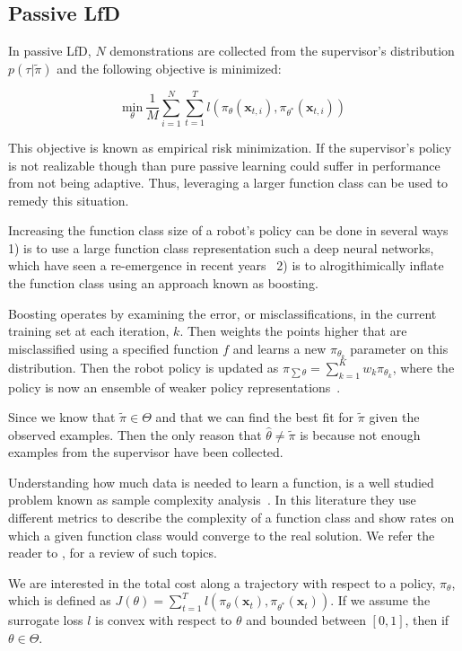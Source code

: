 \documentclass[10pt, conference]{ieeeconf}      %
\newcommand{\bx}{\mathbf{x}}
\begin{document}
\subsection{Passive LfD}
In passive LfD, $N$ demonstrations are collected from the supervisor's distribution $p(\tau|\tilde{\pi})$ and the following objective is minimized: 

$$\underset{\theta}{\mbox{min}} \: \frac{1}{M} \sum^N_{i=1} \sum^T_{t=1} l(\pi_{\theta}(\bx_{t,i}), \pi_{\theta^*}(\bx_{t,i}))$$

This objective is known as empirical risk minimization. If the supervisor's policy is not realizable though than pure passive learning could suffer in performance from not being adaptive. Thus, leveraging a larger function class can be used to remedy this situation. 

Increasing the function class size of a robot's policy can be done in several ways 1) is to use a large function class representation such a deep neural networks, which have seen a re-emergence in recent years~\cite{levine2015end} 2) is to alrogithimically inflate the function class using an approach known as boosting.

Boosting operates by examining the error, or misclassifications, in the current training set at each iteration, $k$. Then weights the points higher that are misclassified using a specified function $f$ and learns a new $\pi_{\theta_k}$ parameter on this distribution.  Then the robot policy is updated as $\pi_{\sum \theta} = \sum^K_{k=1} w_k \pi_{\theta_k}$, where the policy is now an ensemble of weaker policy representations~\cite{mason1999boosting}.


Since we know that $\tilde{\pi} \in \Theta$ and that we can find the best fit for $\tilde{\pi}$ given the observed examples. Then the only reason that $\hat{\theta} \neq \tilde{\pi}$ is because not enough examples from the supervisor have been collected. 

Understanding how much data is needed to learn a function, is a well studied problem known as sample complexity analysis~\cite{anthony2009neural}. In this literature they use different metrics to describe the complexity of a function class and show rates on which a given function class would converge to the real solution. We refer the reader to \cite{vapnik2013nature}, for a review of such topics. 

We are interested in the total cost along a trajectory with respect to a policy, $\pi_{\theta}$, which is defined as $J(\theta) = \sum^T_{t=1} l(\pi_{\theta}(\bx_{t}),\pi_{\theta^*}(\bx_{t}))$.  If we assume the surrogate loss $l$ is convex with respect to $\theta$ and bounded between $[0,1]$, then if $\theta \in \Theta$. \\
\end{document}
